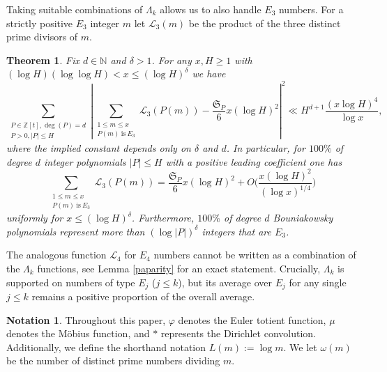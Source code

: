 \documentclass[reqno, 11pt]{amsart}
\numberwithin{equation}{section}
\newtheorem{theorem}{Theorem}[section]
\theoremstyle{definition}
\newtheorem*{notation}{Notation}
\renewcommand{\phi}{\varphi}
\newcommand{\0}{\mathbf{0}}
\renewcommand{\leq}{\leqslant}
\renewcommand{\geq}{\geqslant}
\renewcommand{\P}{\mathbb{P}}
\newcommand{\Z}{\mathbb{Z}}
\renewcommand{\leq}{\leqslant}
\renewcommand{\geq}{\geqslant}
\renewcommand{\#}{\sharp}
\begin{document}
Taking suitable combinations of $\Lambda_k$ 
allows us to also handle  $E_3$ numbers. For a strictly positive  $E_3$ integer $m$
let  $\mathcal L_3(m)$  be the product of the three distinct prime divisors of $m$. \begin{theorem}
\label{thm:bounia33}  Fix  $d\in \mathbb N$ and $\delta>1$. For any $x,H\geq 1$ with 
$ (\log H)(\log \log H)<x \leq (\log H)^\delta$ we have  $$ \sum_{\substack{ P\in \Z[t], \deg(P)=d \\ P>0, |P|\leq H}}
\left|\sum_{\substack{1\leq m\leq x\\P(m) \ \mathrm{ is } \  E_3 } }\mathcal L_3(P(m))
-\frac{\mathfrak S_{ P}}{6} x (\log H)^2\right|^2 \ll  H^{d+1} \frac{(x\log H)^4}{\log x},$$ where the
implied constant depends only on $\delta$ and $d$. In particular, for $100\%$ of degree $d$ integer polynomials $|P|\leq H$ with
a positive leading coefficient  one has   $$\sum_{\substack{1\leq m\leq x\\P(m) \ \mathrm{ is } \  E_3 } }\mathcal L_3(P(m))
=\frac{\mathfrak S_{ P}}{6} x (\log H)^2+O\Bigg( \frac{x(\log H)^2}{(\log x)^{1/4}} \Bigg)$$ uniformly for  $x\leq (\log H)^\delta$. Furthermore, $100\%$ of degree $d$ Bouniakowsky polynomials represent more than  $(\log |P|)^\delta$ integers that are $E_3$.
\end{theorem} 

The analogous function  $\mathcal L_4$ for $E_4$ numbers cannot be written as a combination of the $\Lambda_k$ functions, see Lemma \ref{paparity} for an exact statement.
Crucially, $\Lambda_k$ is supported on numbers of type $E_j$ ($j \leq k$), but its average over  $E_j$ for any single $j\leq k$
remains a positive proportion of the overall average.



\begin{notation} Throughout this paper, $\phi$ denotes the Euler totient function, $\mu$ denotes the Möbius function, and $\ast$ represents the Dirichlet convolution. Additionally, we define the shorthand notation $L(m) := \log m$. We let $\omega(m)$ be the number of distinct prime numbers dividing $m$.
\end{notation}
 
\end{document}
